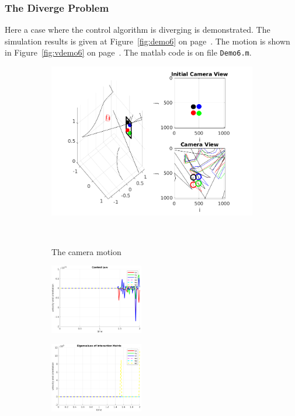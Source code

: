 \documentclass[a4paper,12pt]{article}
\begin{document}
\subsubsection{The Diverge Problem}
Here a case where the control algorithm is diverging is demonstrated. The simulation results is given at 
Figure~\ref{fig:demo6} on page~\pageref{fig:demo6}. The motion is shown in Figure~\ref{fig:vdemo6} 
on page~\pageref{fig:vdemo6}. The matlab code is on file \texttt{Demo6.m}.
\begin{figure}[tb!]
                 \begin{subfigure}[b]{\textwidth}         
                \centering
                 \includegraphics[width=13cm]{../results/Demo6-simulation.png}
             \caption{The camera motion}
             \vspace~
                 \end{subfigure}
         \begin{subfigure}[b]{0.32\textwidth}
                \centering
                \includegraphics[height=1.2in]{../results/Demo6-control-law.png}
                 \end{subfigure}
         \begin{subfigure}[b]{0.2\textwidth}
                \centering
                \includegraphics[height=1.2in]{../results/Demo6-eignen.png}

\end{subfigure}
\end{figure}
\end{document}
